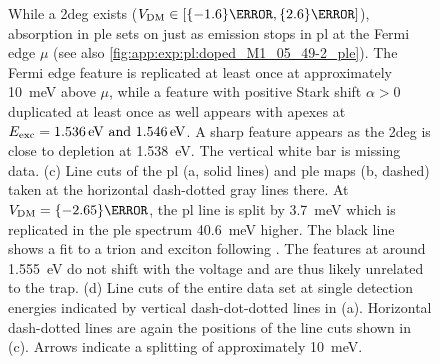 \begin{figure}[H]
{        While a \gls{2deg} exists ($\VDM\in[\qty{-1.6}{\volt}, \qty{2.6}{\volt}]$), absorption in \gls{ple} sets on just as emission stops in \gls{pl} at the Fermi edge $\mu$ (see also \cref{fig:app:exp:pl:doped_M1_05_49-2_ple}).
        The Fermi edge feature is replicated at least once at approximately \qty{10}{\milli\electronvolt} above $\mu$, while a feature with positive Stark shift $\alpha>0$ duplicated at least once as well appears with apexes at $E_{\mr{exc}} = \qtylist{1.536;1.546}{\electronvolt}$.
        A sharp feature appears as the \gls{2deg} is close to depletion at \qty{1.538}{\electronvolt}.
        The vertical white bar is missing data.
        (c) Line cuts of the \gls{pl} (a, solid lines) and \gls{ple} maps (b, dashed) taken at the horizontal dash-dotted gray lines there.
        At $\VDM = \qty{-2.65}{\volt}$, the \gls{pl} line is split by \qty{3.7}{\milli\electronvolt} which is replicated in the \gls{ple} spectrum \qty{40.6}{\milli\electronvolt} higher.
        The black line shows a fit to a trion and exciton following .
        The features at around \qty{1.555}{\electronvolt} do not shift with the voltage and are thus likely unrelated to the trap.
        (d) Line cuts of the entire data set at single detection energies indicated by vertical dash-dot-dotted lines in (a).
        Horizontal dash-dotted lines are again the positions of the line cuts shown in (c).
        Arrows indicate a splitting of approximately \qty{10}{\milli\electronvolt}.
    }
    \label{fig:exp:pl:doped_M1_05_49-2_ple}
\end{figure}

